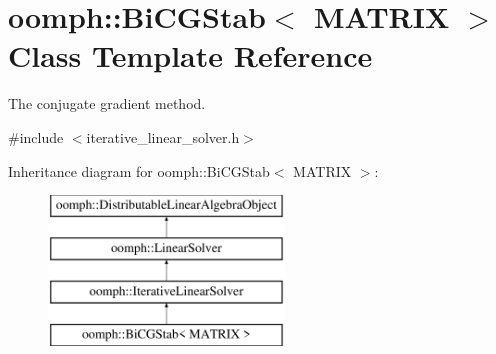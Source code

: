 \hypertarget{classoomph_1_1BiCGStab}{}\section{oomph\+:\+:Bi\+C\+G\+Stab$<$ M\+A\+T\+R\+IX $>$ Class Template Reference}
\label{classoomph_1_1BiCGStab}


The conjugate gradient method.  




{\ttfamily \#include $<$iterative\+\_\+linear\+\_\+solver.\+h$>$}

Inheritance diagram for oomph\+:\+:Bi\+C\+G\+Stab$<$ M\+A\+T\+R\+IX $>$\+:\begin{figure}[H]
\begin{center}
\leavevmode
\includegraphics[height=4.000000cm]{classoomph_1_1BiCGStab}
\end{center}
\end{figure}
